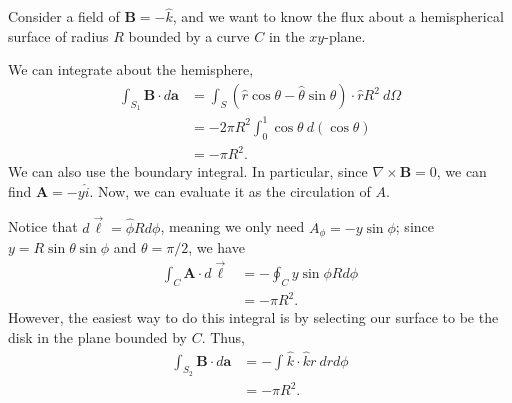 \documentclass[10pt]{mypackage}
\begin{document}
\begin{example}
  Consider a field of $\mathbf{B} = -\hat{k}$, and we want to know the flux about a hemispherical surface of radius $R$ bounded by a curve $C$ in the $xy$-plane.\newline

  We can integrate about the hemisphere,
  \begin{align*}
    \int_{S_1}^{} \mathbf{B}\cdot d\mathbf{a} &= \int_{S}^{} \left(\hat{r}\cos\theta - \hat{\theta}\sin\theta\right)\cdot\hat{r}R^2\:d\Omega\\
                                            &= -2\pi R^2\int_{0}^{1} \cos\theta\:d\left(\cos\theta\right)\\
                                            &= -\pi R^2.
  \end{align*}
  We can also use the boundary integral. In particular, since $\nabla \times \mathbf{B} = 0$, we can find $\mathbf{A} = -y\hat{i}$. Now, we can evaluate it as the circulation of $A$.\newline

  Notice that $d\vec{\ell} = \hat{\phi}Rd\phi$, meaning we only need $A_{\phi} = -y\sin\phi$; since $y = R\sin\theta\sin\phi$ and $\theta = \pi/2$, we have
  \begin{align*}
    \int_{C}^{} \mathbf{A}\cdot d\vec{\ell} &= -\oint_{C} y\sin\phi Rd\phi\\
                                            &= -\pi R^2.
  \end{align*}
  However, the easiest way to do this integral is by selecting our surface to be the disk in the plane bounded by $C$. Thus,
  \begin{align*}
    \int_{S_2}^{} \mathbf{B}\cdot d\mathbf{a} &= -\int_{}^{} \hat{k}\cdot \hat{k} r\:drd\phi\\
                                              &= -\pi R^2.
  \end{align*}
\end{example}
\end{document}
